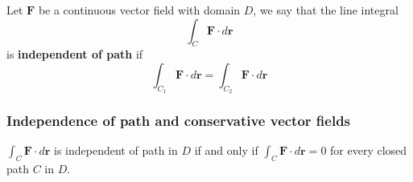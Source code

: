 \documentclass[aspectratio=169]{beamer}
\begin{document}
\begin{frame}
\begin{definition}
Let \(\mathbf{F}\) be a continuous vector field with domain \(D\), we say that the
line integral
\begin{equation*}
    \int_C \mathbf{F} \cdot d\mathbf{r} 
\end{equation*}
is \textbf{independent of path} if
\begin{equation*}
    \int_{C_1} \mathbf{F}\cdot d\mathbf{r} 
    =
    \int_{C_2} \mathbf{F} \cdot d\mathbf{r} 
\end{equation*}
\end{definition}
\end{frame}


\begin{frame}
    \frametitle{Independence of path and conservative vector fields}
    \begin{theorem}
    \(\int_C \mathbf{F}\cdot d\mathbf{r}\) is independent of path in \(D\) if and only if
    \(\int_C \mathbf{F} \cdot d\mathbf{r} = 0\) for every closed path \(C\) in \(D\).
    \end{theorem}
\end{frame}
\end{document}
